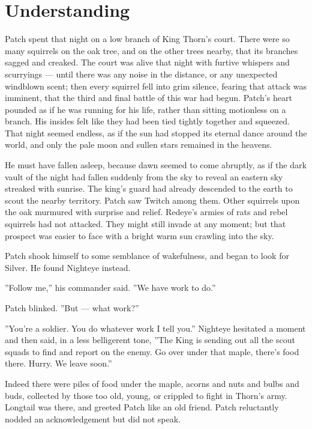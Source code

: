 \documentclass[12pt]{book}
\begin{document}

\section{Understanding}

Patch spent that night on a low branch of King Thorn's court. There
were so many squirrels on the oak tree, and on the other trees nearby,
that its branches sagged and creaked. The court was alive that night
with furtive whispers and scurryings --- until there was any noise in
the distance, or any unexpected windblown scent; then every squirrel
fell into grim silence, fearing that attack was imminent, that the
third and final battle of this war had begun. Patch's heart pounded as
if he was running for his life, rather than sitting motionless on a
branch. His insides felt like they had been tied tightly together and
squeezed. That night seemed endless, as if the sun had stopped its
eternal dance around the world, and only the pale moon and sullen
stars remained in the heavens.

He must have fallen asleep, because dawn seemed to come abruptly, as
if the dark vault of the night had fallen suddenly from the sky to
reveal an eastern sky streaked with sunrise. The king's guard had
already descended to the earth to scout the nearby territory. Patch
saw Twitch among them. Other squirrels upon the oak murmured with
surprise and relief. Redeye's armies of rats and rebel squirrels had
not attacked. They might still invade at any moment; but that prospect
was easier to face with a bright warm sun crawling into the sky.

Patch shook himself to some semblance of wakefulness, and began to
look for Silver. He found Nighteye instead.

''Follow me,'' his commander said. ''We have work to do.''

Patch blinked. ''But --- what work?''

''You're a soldier. You do whatever work I tell you.'' Nighteye
hesitated a moment and then said, in a less belligerent tone, ''The
King is sending out all the scout squads to find and report on the
enemy. Go over under that maple, there's food there. Hurry. We leave
soon.''

Indeed there were piles of food under the maple, acorns and nuts and
bulbs and buds, collected by those too old, young, or crippled to
fight in Thorn's army. Longtail was there, and greeted Patch like an
old friend. Patch reluctantly nodded an acknowledgement but did not
speak.
\end{document}
